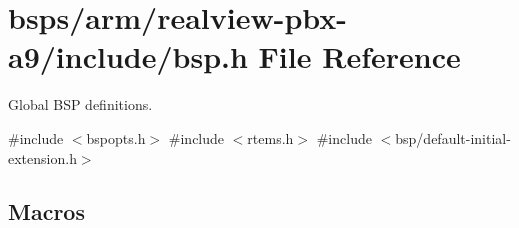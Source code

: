\hypertarget{bsps_2arm_2realview-pbx-a9_2include_2bsp_8h}{}\section{bsps/arm/realview-\/pbx-\/a9/include/bsp.h File Reference}
\label{bsps_2arm_2realview-pbx-a9_2include_2bsp_8h}


Global B\+SP definitions.  


{\ttfamily \#include $<$bspopts.\+h$>$}\newline
{\ttfamily \#include $<$rtems.\+h$>$}\newline
{\ttfamily \#include $<$bsp/default-\/initial-\/extension.\+h$>$}\newline
\subsection*{Macros}
